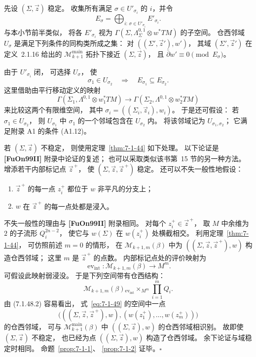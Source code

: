 先设 $(\Sigma,\vec z)$ 稳定。
收集所有满足
$\sigma\in U'_{\sigma_i}$
的 $i$，并令
\[
E_\sigma=
\bigoplus_{i:\,\sigma\in U'_{\sigma_i}}
E'_{\sigma_i}.
\]
与本小节前半类似，
将各
$E'_{\sigma_i}$
视为
$\Gamma(\Sigma,\Lambda^{0,1}_\Sigma\otimes w^*TM)$
的子空间。
仓西邻域 $U_\sigma$
是满足下列条件的同构类所成之集：
对
$((\Sigma',\vec z'),w')$，
其域
$(\Sigma',\vec z')$
在定义~2.1.16 给出的
$\mathcal M^{\mathrm{main}}_{k+1}$
拓扑下接近
$(\Sigma,\vec z)$，
且
$\bar\partial w'\equiv0\pmod{E_\sigma}$。

由于
$U'_{\sigma_i}$ 闭，
可选择 $U_\sigma$，
使
\[
\sigma_1\in U_{\sigma_2}
\quad\Longrightarrow\quad
E_{\sigma_1}\subseteq E_{\sigma_2}.
\]
这里借助由平行移动定义的映射
\[
\Gamma(\Sigma_1,\Lambda^{0,1}\otimes w_1^*TM)
\longrightarrow
\Gamma(\Sigma_2,\Lambda^{0,1}\otimes w_2^*TM)
\]
来比较这两个有限维空间，
其中
$\sigma_i=((\Sigma_i,\vec z_i),w_i)$。
于是还可假设：
若 $\sigma_1\in U_{\sigma_2}$，
则
$U_{\sigma_1}$ 中 $\sigma_1$
的一个邻域包含在
$U_{\sigma_2}$ 内。
将该邻域记为
$U_{\sigma_1,\sigma_2}$；
它满足附录 A1 的条件 (A1.12)。

若 $(\Sigma,\vec z)$ 不稳定，
则使用定理~\ref{thm:7-1-44}
如下处理。
以下论证是
\textbf{[FuOn99II]} 附录中论证的复述；
也可以采取类似该书第~15 节的另一种方法。
增添若干内部标记点
$\vec z^{\, +}$，
使
$(\Sigma,\vec z,\vec z^{\, +})$
稳定。
还可以不失一般性地假设：
\begin{enumerate}[label=\textup{(7.1.48.\arabic*)},leftmargin=6em]
\item\label{eq:7-1-48-1}
$\vec z^{\, +}$ 的每一点 $z_i^+$
都位于 $w$ 非平凡的分支上；
\item\label{eq:7-1-48-2}
$w$ 在 $\vec z^{\, +}$ 的每一点处都是浸入。
\end{enumerate}
不失一般性的理由与
\textbf{[FuOn99II]} 附录相同。
对每个
$z_i^+\in\vec z^{\, +}$，
取 $M$ 中余维为 $2$ 的子流形
$Q_i^{2n-2}$，
使它与 $w(\Sigma)$
在 $w(z_i^+)$ 处横截相交。
利用定理~\ref{thm:7-1-44}，
可仿照前述 $m=0$ 的情形，
在
$\mathcal M_{k+1,m}(\beta)$
中为
$((\Sigma,\vec z,\vec z^{\, +}),w)$
构造仓西邻域；
这里 $m$ 是
$\vec z^{\, +}$ 的点数。
内部标记点处的评价映射为
\[
\operatorname{ev}_{\mathrm{int}}\colon
\mathcal M_{k+1,m}(\beta)\longrightarrow M^m.
\]
可假设此映射弱浸没。
于是下列空间带有仓西结构：
\begin{equation}
\mathcal M_{k+1,m}(\beta)
{}_{\operatorname{ev}_{\mathrm{int}}}
\!\times_{M^m}
\prod_{i=1}^{m}Q_i.
\tag{7.1.49}\label{eq:7-1-49}
\end{equation}
由 (7.1.48.2) 容易看出，
式~\eqref{eq:7-1-49} 的空间中一点
\[
\bigl(
((\Sigma,\vec z,\vec z^{\, +}),w),
(w(z_1^+),\ldots,w(z_m^+))
\bigr)
\]
的仓西邻域，
可与
$\mathcal M^{\mathrm{main}}_{k+1}(\beta)$
中
$((\Sigma,\vec z),w)$
的仓西邻域相识别。
故即使
$(\Sigma,\vec z)$
不稳定，
也已经为点
$((\Sigma,\vec z),w)$
构造了仓西邻域。
余下论证与域稳定时相同。
命题~\ref{prop:7-1-1}、
\ref{prop:7-1-2} 证毕。\hfill$\square$
